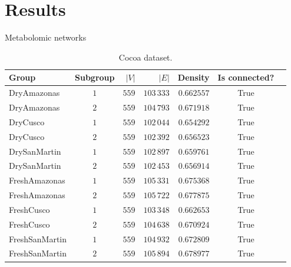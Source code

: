 \documentclass[aspectratio=169]{beamer}
\begin{document}
\section{Results}
    \begin{frame}{Metabolomic networks}
        \begin{table}[htp!]
            \footnotesize %
            \centering
            \caption{Cocoa dataset.} %
            \begin{tabular}{@{}lcrrrcr@{}}\toprule
                Group & Subgroup & $|V|$  & $|E|$ & Density & Is connected? \\\midrule
                DryAmazonas    &	$1$ &	$559$	& $103\,333$ &	$0.662557$ &	True & \\
                DryAmazonas    &	$2$ &	$559$	& $104\,793$ &	$0.671918$ &	True & \\\midrule
                DryCusco       &	$1$ &	$559$	& $102\,044$ &	$0.654292$ & 	True & \\
                DryCusco       &	$2$ &	$559$	& $102\,392$ &	$0.656523$ & 	True & \\\midrule
                DrySanMartin   &	$1$ &	$559$	& $102\,897$ &	$0.659761$ &	True & \\
                DrySanMartin   &	$2$ &	$559$	& $102\,453$ &	$0.656914$ &	True & \\\midrule
                
                FreshAmazonas  &	$1$ &	$559$ & $105\,331$ &	$0.675368$ &	True & \\
                FreshAmazonas  &	$2$ &	$559$ & $105\,722$ &	$0.677875$ &	True & \\\midrule
                FreshCusco     &	$1$ &	$559$ & $103\,348$ &	$0.662653$ &	True & \\
                FreshCusco     &	$2$ &	$559$ & $104\,638$ &	$0.670924$ &	True & \\\midrule
                FreshSanMartin &	$1$ &	$559$ & $104\,932$ &	$0.672809$ &	True & \\
                FreshSanMartin &	$2$ &	$559$ & $105\,894$ &	$0.678977$ &	True & \\\bottomrule
            \end{tabular}
        \end{table}


\end{frame}
\end{document}

